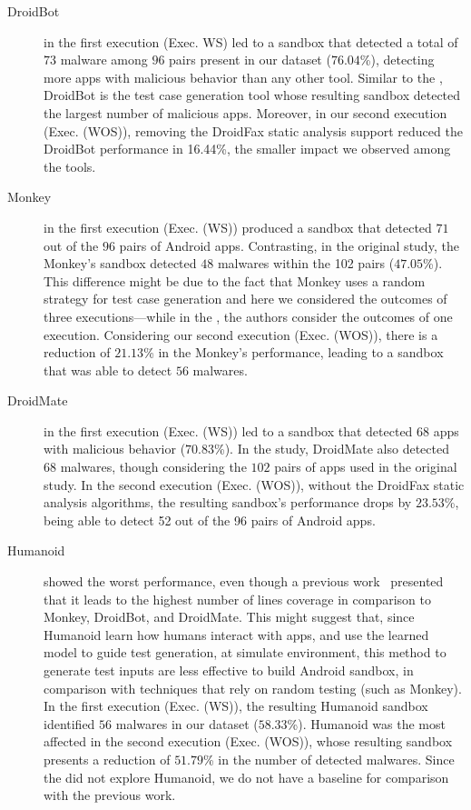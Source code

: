 \begin{description}
\item[DroidBot] in the first execution (Exec. WS) led to a sandbox that detected a total of $73$ malware among $96$ pairs present in our dataset ($76.04$\%),
  detecting more apps with malicious behavior than any other tool. Similar to the \blls, DroidBot is the test case generation tool
  whose resulting sandbox detected the largest number of malicious apps. Moreover, in our second execution (Exec. (WOS)), removing the DroidFax
  static analysis support reduced the DroidBot performance in 16.44\%, the smaller impact we observed among the tools.

  \item[Monkey] in the first execution (Exec. (WS)) produced a sandbox that detected $71$ out of the $96$ pairs of Android apps.
    Contrasting, in the original study, the Monkey's sandbox detected $48$ malwares within the 102 pairs ($47.05$\%). This difference
    might be due to the fact that Monkey uses a random strategy for test case generation and here we considered the outcomes
    of three executions---while in the \blls, the authors consider the outcomes of one execution. 
    Considering our second execution (Exec. (WOS)), there is a reduction of $21.13$\% in the Monkey's performance, leading to
    a sandbox that was able to detect $56$ malwares. 

  \item[DroidMate] in the first execution (Exec. (WS)) led to a sandbox that detected 68 apps with malicious behavior ($70.83$\%).
    In the \blls study, DroidMate also detected $68$ malwares, though considering the $102$ pairs of apps used in the
    original study. In the second execution (Exec. (WOS)),
    without the DroidFax static analysis algorithms, the resulting sandbox's performance drops by $23.53$\%, being able to detect
    52 out of the 96 pairs of Android apps.
    
  \item[Humanoid] showed the worst performance, even though a previous work~\cite{DBLP:conf/kbse/LiY0C19} presented that it leads to
    the highest number of lines coverage in comparison to Monkey, DroidBot, and DroidMate. This might suggest that, since Humanoid learn how humans interact with apps, and use the learned model to guide test generation, at simulate environment, this method to generate test inputs are less effective to build Android sandbox, in comparison with techniques that rely on random testing (such as Monkey). In the first execution (Exec. (WS)),
    the resulting Humanoid sandbox identified $56$ malwares in our dataset ($58.33$\%). Humanoid was the most affected in the second
    execution (Exec. (WOS)), whose resulting sandbox presents a reduction of $51.79$\%  in the number of detected malwares.
    Since the \blls did not explore Humanoid,
    we do not have a baseline for comparison with the previous work.
    

\end{description}
